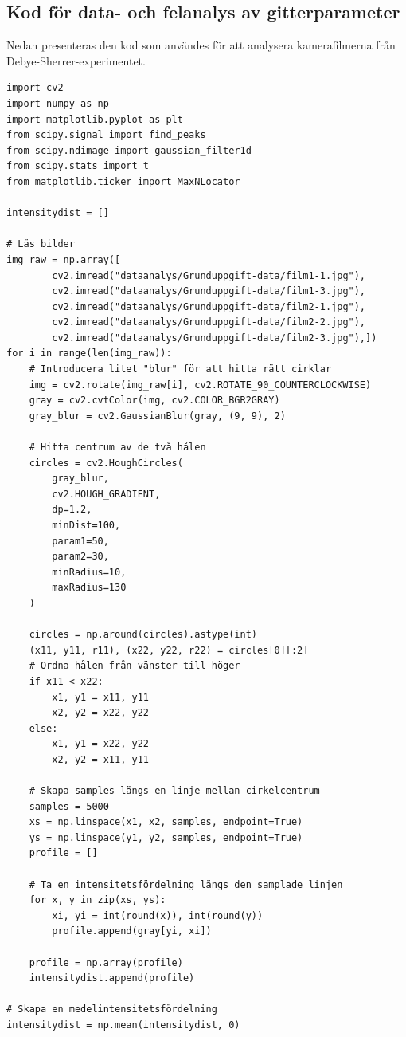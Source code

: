 \documentclass[12pt, a4paper]{article}
\begin{document}
\subsection{Kod för data- och felanalys av gitterparameter}
\label{app:kod-debye-sherrer}
Nedan presenteras den kod som användes för att analysera kamerafilmerna från Debye-Sherrer-experimentet.
\begin{lstlisting}[style=mypython, label={lst:dataanalys_Debye-Sherrer}]
import cv2
import numpy as np
import matplotlib.pyplot as plt
from scipy.signal import find_peaks
from scipy.ndimage import gaussian_filter1d
from scipy.stats import t
from matplotlib.ticker import MaxNLocator

intensitydist = []

# Läs bilder
img_raw = np.array([
        cv2.imread("dataanalys/Grunduppgift-data/film1-1.jpg"), 
        cv2.imread("dataanalys/Grunduppgift-data/film1-3.jpg"), 
        cv2.imread("dataanalys/Grunduppgift-data/film2-1.jpg"),
        cv2.imread("dataanalys/Grunduppgift-data/film2-2.jpg"), 
        cv2.imread("dataanalys/Grunduppgift-data/film2-3.jpg"),])
for i in range(len(img_raw)):
    # Introducera litet "blur" för att hitta rätt cirklar
    img = cv2.rotate(img_raw[i], cv2.ROTATE_90_COUNTERCLOCKWISE)
    gray = cv2.cvtColor(img, cv2.COLOR_BGR2GRAY)
    gray_blur = cv2.GaussianBlur(gray, (9, 9), 2)

    # Hitta centrum av de två hålen
    circles = cv2.HoughCircles(
        gray_blur,
        cv2.HOUGH_GRADIENT,
        dp=1.2,
        minDist=100,
        param1=50,
        param2=30,
        minRadius=10,
        maxRadius=130
    )

    circles = np.around(circles).astype(int)
    (x11, y11, r11), (x22, y22, r22) = circles[0][:2]
    # Ordna hålen från vänster till höger
    if x11 < x22:
        x1, y1 = x11, y11
        x2, y2 = x22, y22
    else:
        x1, y1 = x22, y22
        x2, y2 = x11, y11

    # Skapa samples längs en linje mellan cirkelcentrum
    samples = 5000
    xs = np.linspace(x1, x2, samples, endpoint=True)
    ys = np.linspace(y1, y2, samples, endpoint=True)
    profile = []

    # Ta en intensitetsfördelning längs den samplade linjen
    for x, y in zip(xs, ys):
        xi, yi = int(round(x)), int(round(y))
        profile.append(gray[yi, xi])

    profile = np.array(profile)
    intensitydist.append(profile)

# Skapa en medelintensitetsfördelning
intensitydist = np.mean(intensitydist, 0)


\end{lstlisting}
\end{document}
